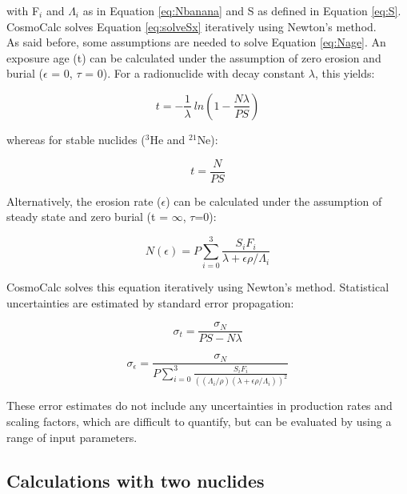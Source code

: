 \documentclass{article}
\begin{document}
with F$_i$  and $\Lambda_i$ as  in Equation \ref{eq:Nbanana} and  S as
defined in Equation \ref{eq:S}. CosmoCalc solves Equation \ref{eq:solveSx}
iteratively using Newton's method.
\\

As  said  before,  some  assumptions  are  needed  to  solve  Equation
\ref{eq:Nage}.   An  exposure age  (t)  can  be  calculated under  the
assumption of  zero erosion and burial  ($\epsilon$ = 0, $\tau$  = 0). 
For a radionuclide with decay constant $\lambda$, this yields:

\begin{equation}
  \label{eq:age}
  t = - \frac{1}{\lambda} ~ln\left(1 - \frac{N \lambda}{P S}\right)
\end{equation}

whereas for stable nuclides ($^3$He and $^{21}$Ne):

\begin{equation}
  \label{eq:stableAge}
  t = \frac{N}{P S}
\end{equation}

Alternatively, the  erosion rate ($\epsilon$) can  be calculated under
the  assumption  of  steady  state  and zero  burial  (t  =  $\infty$,
$\tau$=0):

\begin{equation}
  \label{eq:erosion}
N(\epsilon) = P \sum_{i=0}^3 \frac{S_i F_i}{\lambda + \epsilon \rho / \Lambda_i} 
\end{equation}

CosmoCalc  solves this  equation  iteratively using  Newton's method.  
Statistical uncertainties are estimated by standard error propagation:

\begin{equation}
  \label{eq:sigmAge}
  \sigma_t = \frac{\sigma_N}{P S - N \lambda}
\end{equation}

\begin{equation}
  \label{eq:sigmaErosion}
  \sigma_{\epsilon} = \frac{\sigma_N}
{P \sum_{i=0}^3 \frac{S_i F_i}
{\left( (\Lambda_i / \rho) (\lambda + \epsilon \rho / \Lambda_i)\right)^2}}
\end{equation}

These error  estimates do not include any  uncertainties in production
rates and scaling factors, which are difficult to quantify, but can be
evaluated by using a range of input parameters.

\subsection{Calculations with two nuclides}\label{sec:twoN}
\end{document}
